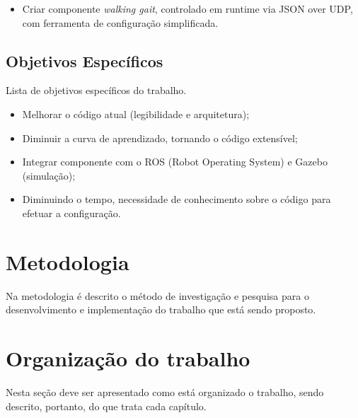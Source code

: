 \begin{itemize}
  \item Criar componente \textit{walking gait}, controlado em runtime via JSON over UDP, com ferramenta de configuração simplificada.
\end{itemize}

\subsection{Objetivos Específicos} 

Lista de objetivos específicos do trabalho.

\begin{itemize}
  \item Melhorar o código atual (legibilidade e arquitetura);
  \item Diminuir a curva de aprendizado, tornando o código extensível;
  \item Integrar componente com o ROS (Robot Operating System) e Gazebo (simulação);
  \item Diminuindo o tempo, necessidade de conhecimento sobre o código para efetuar a configuração.
\end{itemize}

\section{Metodologia}

Na metodologia é descrito o método de investigação e pesquisa para o
desenvolvimento e implementação do trabalho que está sendo proposto.

\section{Organização do trabalho}

Nesta seção deve ser apresentado como está organizado o trabalho, sendo
descrito, portanto, do que trata cada capítulo.

